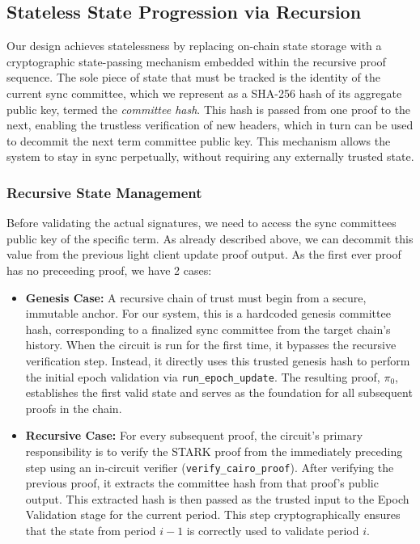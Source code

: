 \documentclass[runningheads]{llncs}
\begin{document}
\subsection{Stateless State Progression via Recursion}
\label{subsection:stateless_recursion}

Our design achieves statelessness by replacing on-chain state storage with a cryptographic state-passing mechanism embedded within the recursive proof sequence. The sole piece of state that must be tracked is the identity of the current sync committee, which we represent as a SHA-256 hash of its aggregate public key, termed the \textit{committee hash}. This hash is passed from one proof to the next, enabling the trustless verification of new headers, which in turn can be used to decommit the next term committee public key. This mechanism allows the system to stay in sync perpetually, without requiring any externally trusted state.

\subsubsection{Recursive State Management}
Before validating the actual signatures, we need to access the sync committees public key of the specific term. As already described above, we can decommit this value from the previous light client update proof output. As the first ever proof has no preceeding proof, we have 2 cases:

\begin{itemize}
    \item \textbf{Genesis Case:} A recursive chain of trust must begin from a secure, immutable anchor. For our system, this is a hardcoded genesis committee hash, corresponding to a finalized sync committee from the target chain's history. When the circuit is run for the first time, it bypasses the recursive verification step. Instead, it directly uses this trusted genesis hash to perform the initial epoch validation via \texttt{run\_epoch\_update}. The resulting proof, $\pi_0$, establishes the first valid state and serves as the foundation for all subsequent proofs in the chain.

    \item \textbf{Recursive Case:} For every subsequent proof, the circuit's primary responsibility is to verify the STARK proof from the immediately preceding step using an in-circuit verifier (\texttt{verify\_cairo\_proof}). After verifying the previous proof, it extracts the committee hash from that proof's public output. This extracted hash is then passed as the trusted input to the Epoch Validation stage for the current period. This step cryptographically ensures that the state from period $i-1$ is correctly used to validate period $i$.
\end{itemize}
\end{document}
